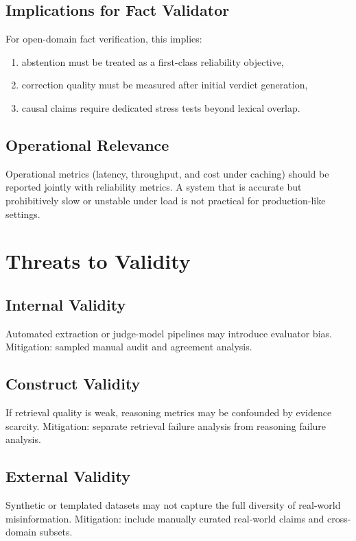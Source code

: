 \documentclass[12pt,a4paper,oneside]{report}
\begin{document}
\section{Implications for Fact Validator}
For open-domain fact verification, this implies:
\begin{enumerate}
  \item abstention must be treated as a first-class reliability objective,
  \item correction quality must be measured after initial verdict generation,
  \item causal claims require dedicated stress tests beyond lexical overlap.
\end{enumerate}

\section{Operational Relevance}
Operational metrics (latency, throughput, and cost under caching) should be reported jointly with reliability metrics.
A system that is accurate but prohibitively slow or unstable under load is not practical for production-like settings.

\chapter{Threats to Validity}
\label{chap:validity}

\section{Internal Validity}
Automated extraction or judge-model pipelines may introduce evaluator bias.
Mitigation: sampled manual audit and agreement analysis.

\section{Construct Validity}
If retrieval quality is weak, reasoning metrics may be confounded by evidence scarcity.
Mitigation: separate retrieval failure analysis from reasoning failure analysis.

\section{External Validity}
Synthetic or templated datasets may not capture the full diversity of real-world misinformation.
Mitigation: include manually curated real-world claims and cross-domain subsets.
\end{document}
